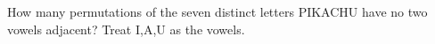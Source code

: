 How many permutations of the seven distinct letters PIKACHU have no two vowels adjacent? Treat I,A,U as the vowels.
